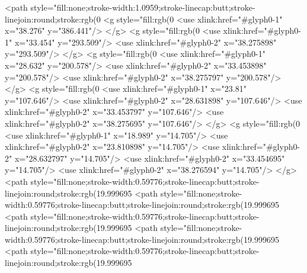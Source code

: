 <path style="fill:none;stroke-width:1.0959;stroke-linecap:butt;stroke-linejoin:round;stroke:rgb(0%
<g style="fill:rgb(0%
  <use xlink:href="#glyph0-1" x="38.276" y="386.441"/>
</g>
<g style="fill:rgb(0%
  <use xlink:href="#glyph0-1" x="33.454" y="293.509"/>
  <use xlink:href="#glyph0-2" x="38.275898" y="293.509"/>
</g>
<g style="fill:rgb(0%
  <use xlink:href="#glyph0-1" x="28.632" y="200.578"/>
  <use xlink:href="#glyph0-2" x="33.453898" y="200.578"/>
  <use xlink:href="#glyph0-2" x="38.275797" y="200.578"/>
</g>
<g style="fill:rgb(0%
  <use xlink:href="#glyph0-1" x="23.81" y="107.646"/>
  <use xlink:href="#glyph0-2" x="28.631898" y="107.646"/>
  <use xlink:href="#glyph0-2" x="33.453797" y="107.646"/>
  <use xlink:href="#glyph0-2" x="38.275695" y="107.646"/>
</g>
<g style="fill:rgb(0%
  <use xlink:href="#glyph0-1" x="18.989" y="14.705"/>
  <use xlink:href="#glyph0-2" x="23.810898" y="14.705"/>
  <use xlink:href="#glyph0-2" x="28.632797" y="14.705"/>
  <use xlink:href="#glyph0-2" x="33.454695" y="14.705"/>
  <use xlink:href="#glyph0-2" x="38.276594" y="14.705"/>
</g>
<path style="fill:none;stroke-width:0.59776;stroke-linecap:butt;stroke-linejoin:round;stroke:rgb(19.999695%
<path style="fill:none;stroke-width:0.59776;stroke-linecap:butt;stroke-linejoin:round;stroke:rgb(19.999695%
<path style="fill:none;stroke-width:0.59776;stroke-linecap:butt;stroke-linejoin:round;stroke:rgb(19.999695%
<path style="fill:none;stroke-width:0.59776;stroke-linecap:butt;stroke-linejoin:round;stroke:rgb(19.999695%
<path style="fill:none;stroke-width:0.59776;stroke-linecap:butt;stroke-linejoin:round;stroke:rgb(19.999695%
